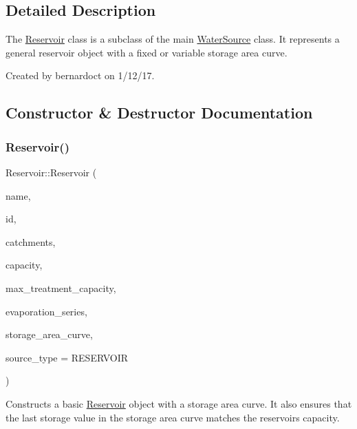 \subsection{Detailed Description}
The {\ttfamily \mbox{\hyperlink{classReservoir}{Reservoir}}} class is a subclass of the main {\ttfamily \mbox{\hyperlink{classWaterSource}{Water\+Source}}} class. It represents a general reservoir object with a fixed or variable storage area curve. 

Created by bernardoct on 1/12/17. 

\subsection{Constructor \& Destructor Documentation}
\mbox{\label{classReservoir_ac9803ae5446e4e9a2631ce66817004cf}} 
\subsubsection{\texorpdfstring{Reservoir()}{Reservoir()}\hspace{0.1cm}{\footnotesize\ttfamily [1/9]}}
{\footnotesize\ttfamily Reservoir\+::\+Reservoir (\begin{DoxyParamCaption}\item[{const char $\ast$}]{name,  }\item[{const int}]{id,  }\item[{const vector$<$ \mbox{\hyperlink{classCatchment}{Catchment}} $\ast$$>$ \&}]{catchments,  }\item[{const double}]{capacity,  }\item[{const double}]{max\+\_\+treatment\+\_\+capacity,  }\item[{\mbox{\hyperlink{classEvaporationSeries}{Evaporation\+Series}} \&}]{evaporation\+\_\+series,  }\item[{\mbox{\hyperlink{classDataSeries}{Data\+Series}} $\ast$}]{storage\+\_\+area\+\_\+curve,  }\item[{int}]{source\+\_\+type = {\ttfamily RESERVOIR} }\end{DoxyParamCaption})}



Constructs a basic \mbox{\hyperlink{classReservoir}{Reservoir}} object with a storage area curve. It also ensures that the last storage value in the storage area curve matches the reservoir\textquotesingle{}s capacity. 

